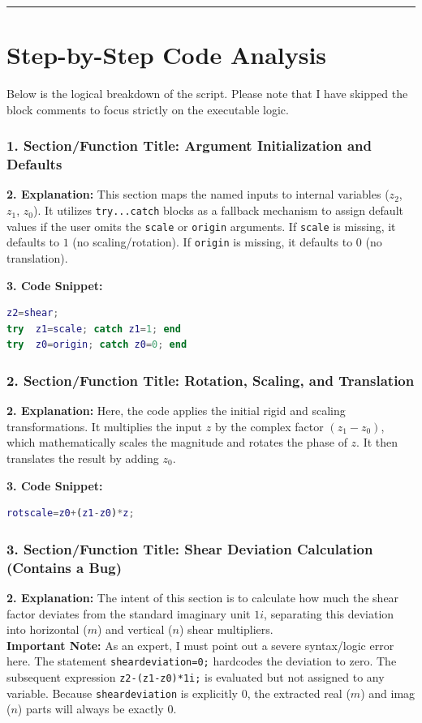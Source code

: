 \vspace{0.5cm}
\hrule
\vspace{0.5cm}

\section*{Step-by-Step Code Analysis}

Below is the logical breakdown of the script. Please note that I have skipped the block comments to focus strictly on the executable logic.

\subsubsection*{1. Section/Function Title: Argument Initialization and Defaults}
\textbf{2. Explanation:} This section maps the named inputs to internal variables ($z_2$, $z_1$, $z_0$). It utilizes \texttt{try...catch} blocks as a fallback mechanism to assign default values if the user omits the \texttt{scale} or \texttt{origin} arguments. If \texttt{scale} is missing, it defaults to $1$ (no scaling/rotation). If \texttt{origin} is missing, it defaults to $0$ (no translation).

\textbf{3. Code Snippet:}
\begin{lstlisting}[language=Matlab]
z2=shear;
try  z1=scale; catch z1=1; end
try  z0=origin; catch z0=0; end
\end{lstlisting}


\subsubsection*{2. Section/Function Title: Rotation, Scaling, and Translation}
\textbf{2. Explanation:} Here, the code applies the initial rigid and scaling transformations. It multiplies the input $z$ by the complex factor $(z_1 - z_0)$, which mathematically scales the magnitude and rotates the phase of $z$. It then translates the result by adding $z_0$.

\textbf{3. Code Snippet:}
\begin{lstlisting}[language=Matlab]
rotscale=z0+(z1-z0)*z;
\end{lstlisting}


\subsubsection*{3. Section/Function Title: Shear Deviation Calculation (Contains a Bug)}
\textbf{2. Explanation:} The intent of this section is to calculate how much the shear factor deviates from the standard imaginary unit $1i$, separating this deviation into horizontal ($m$) and vertical ($n$) shear multipliers. \\
\textbf{Important Note:} As an expert, I must point out a severe syntax/logic error here. The statement \texttt{sheardeviation=0;} hardcodes the deviation to zero. The subsequent expression \texttt{z2-(z1-z0)*1i;} is evaluated but not assigned to any variable. Because \texttt{sheardeviation} is explicitly $0$, the extracted real ($m$) and imag ($n$) parts will always be exactly $0$.

